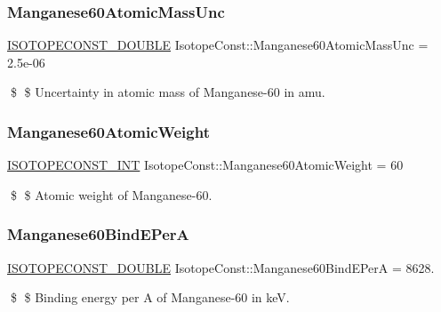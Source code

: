 \subsubsection{\texorpdfstring{Manganese60\+Atomic\+Mass\+Unc}{Manganese60AtomicMassUnc}}
{\footnotesize\ttfamily \mbox{\hyperlink{group___isotope_const-_macros_ga8f45a7272ce02c0b4c65c44636ed719a}{I\+S\+O\+T\+O\+P\+E\+C\+O\+N\+S\+T\+\_\+\+D\+O\+U\+B\+LE}} Isotope\+Const\+::\+Manganese60\+Atomic\+Mass\+Unc = 2.\+5e-\/06}

\$ \$ Uncertainty in atomic mass of Manganese-\/60 in amu. \mbox{\label{group___isotope_const-_manganese-_mn60_ga8c4bbaf1d4985736aac2bb052e6723e9}} 
\subsubsection{\texorpdfstring{Manganese60\+Atomic\+Weight}{Manganese60AtomicWeight}}
{\footnotesize\ttfamily \mbox{\hyperlink{group___isotope_const-_macros_ga5f18360b3e99483a35c32d789e62621c}{I\+S\+O\+T\+O\+P\+E\+C\+O\+N\+S\+T\+\_\+\+I\+NT}} Isotope\+Const\+::\+Manganese60\+Atomic\+Weight = 60}

\$ \$ Atomic weight of Manganese-\/60. \mbox{\label{group___isotope_const-_manganese-_mn60_ga592ffe420637bc191a6cfbf7421ed741}} 
\subsubsection{\texorpdfstring{Manganese60\+Bind\+E\+PerA}{Manganese60BindEPerA}}
{\footnotesize\ttfamily \mbox{\hyperlink{group___isotope_const-_macros_ga8f45a7272ce02c0b4c65c44636ed719a}{I\+S\+O\+T\+O\+P\+E\+C\+O\+N\+S\+T\+\_\+\+D\+O\+U\+B\+LE}} Isotope\+Const\+::\+Manganese60\+Bind\+E\+PerA = 8628.}

\$ \$ Binding energy per A of Manganese-\/60 in keV. \mbox{\label{group___isotope_const-_manganese-_mn60_gac9afe57951a1fc952273b2a07761190a}} 
